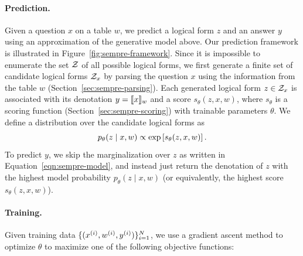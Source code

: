 \paragraph{Prediction.}
Given a question $x$ on a table $w$,
we predict a logical form $z$ and an answer $y$
using an approximation of the generative model above.
Our prediction framework is illustrated in 
Figure~\ref{fig:sempre-framework}.
Since it is impossible to enumerate the set $\mathcal{Z}$
of all possible logical forms,
we first generate a finite set of candidate logical forms
$\mathcal{Z}_x$ by parsing the question $x$ using the information
from the table $w$ (Section~\ref{sec:sempre-parsing}).
Each generated logical form $z \in \mathcal{Z}_x$
is associated with its denotation $y = \llbracket{x}\rrbracket_{w}$
and a score $s_\theta(z, x, w)$,
where $s_\theta$ is a scoring function
(Section~\ref{sec:sempre-scoring})
with trainable parameters $\theta$.
We define a distribution over the candidate logical forms as
\begin{equation}
p_\theta(z \mid x, w) \propto \exp\left[ s_\theta(z, x, w) \right].
\end{equation}
To predict $y$, we skip the marginalization over $z$
as written in Equation~\ref{eqn:sempre-model},
and instead just return the denotation of $z$
with the highest model probability $p_\theta(z\mid x, w)$
(or equivalently, the highest score $s_\theta(z, x, w)$).

\paragraph{Training.}
Given training data $\{(x^{(i)}, w^{(i)}, y^{(i)})\}_{i=1}^N$,
we use a gradient ascent method to optimize $\theta$ to maximize
one of the following objective functions:

